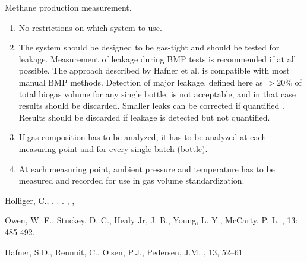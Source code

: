   \item Methane production measurement.
    \begin{enumerate}
      \item No restrictions on which system to use.
      \item The system should be designed to be gas-tight and should be tested for leakage. 
        Measurement of leakage during BMP tests is recommended if at all possible.
        The approach described by Hafner et al. \cite{leaks2018} is compatible with most manual BMP methods.
        Detection of major leakage, defined here as $> 20\%$ of total biogas volume for any single bottle, is not acceptable, and in that case results should be discarded.
        Smaller leaks can be corrected if quantified \cite{leaks2018}.
        Results should be discarded if leakage is detected but not quantified.
      \item If gas composition has to be analyzed, it has to be analyzed at each measuring point and for every single batch (bottle).
      \item At each measuring point, ambient pressure and temperature has to be measured and recorded for use in gas volume standardization.
    \end{enumerate}



Holliger, C., . . .
    ,
    ,


Owen, W. F., Stuckey, D. C., Healy Jr, J. B., Young, L. Y., McCarty, P. L.
,
 13: 485-492.

Hafner, S.D., Rennuit, C., Olsen, P.J., Pedersen, J.M.
,
 13, 52–61

